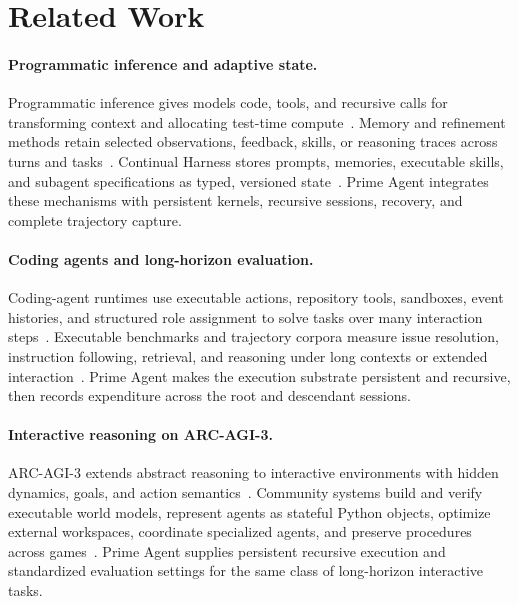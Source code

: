 \section{Related Work}

\paragraph{Programmatic inference and adaptive state.}
Programmatic inference gives models code, tools, and recursive calls for transforming context and allocating test-time compute~\citep{yao2023react,schick2023toolformer,wang2024codeact,zhang2025recursivelanguagemodels,prolong2026,snell2024scalingtesttime}.
Memory and refinement methods retain selected observations, feedback, skills, or reasoning traces across turns and tasks~\citep{packer2023memgpt,shinn2023reflexion,madaan2023selfrefine,wang2023voyager,park2023generative,zelikman2022star}.
Continual Harness stores prompts, memories, executable skills, and subagent specifications as typed, versioned state~\citep{karten2026continualharness}.
Prime Agent integrates these mechanisms with persistent kernels, recursive sessions, recovery, and complete trajectory capture.
\paragraph{Coding agents and long-horizon evaluation.}
Coding-agent runtimes use executable actions, repository tools, sandboxes, event histories, and structured role assignment to solve tasks over many interaction steps~\citep{wang2024codeact,sweagent2024,openhands2024,wu2023autogen,li2023camel,hong2023metagpt,qian2023chatdev}.
Executable benchmarks and trajectory corpora measure issue resolution, instruction following, retrieval, and reasoning under long contexts or extended interaction~\citep{swebench2024,pan2024swegym,xu2024agenttrek,oolong2025,obliq2026,longbenchpro2026,longbenchv2,longcot2026}.
Prime Agent makes the execution substrate persistent and recursive, then records expenditure across the root and descendant sessions.

\paragraph{Interactive reasoning on ARC-AGI-3.}
ARC-AGI-3 extends abstract reasoning to interactive environments with hidden dynamics, goals, and action semantics~\citep{arcagi3,arccommunity2026}.
Community systems build and verify executable world models, represent agents as stateful Python objects, optimize external workspaces, coordinate specialized agents, and preserve procedures across games~\citep{rodionov2026executableworldmodels,furgale2026nooa,courtis2026opineworld,sarafian2026workspaceoptimization,karten2026continualharness,prolong2026}.
Prime Agent supplies persistent recursive execution and standardized evaluation settings for the same class of long-horizon interactive tasks.

